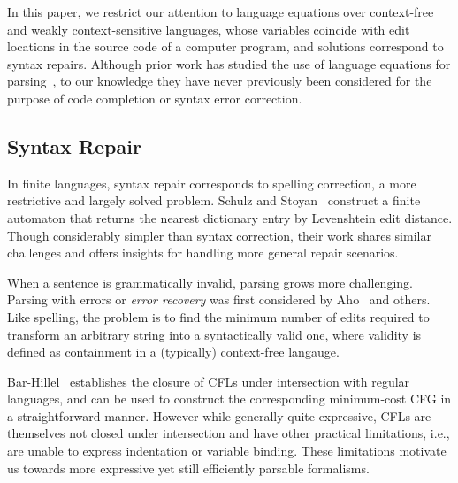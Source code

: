 \documentclass[sigplan,review,anonymous,acmsmall]{acmart}\settopmatter{printfolios=false,printccs=false,printacmref=false}
\begin{document}
In this paper, we restrict our attention to language equations over context-free and weakly context-sensitive languages, whose variables coincide with edit locations in the source code of a computer program, and solutions correspond to syntax repairs. Although prior work has studied the use of language equations for parsing~\cite{might2011parsing}, to our knowledge they have never previously been considered for the purpose of code completion or syntax error correction.



\subsection{Syntax Repair}

In finite languages, syntax repair corresponds to spelling correction, a more restrictive and largely solved problem. Schulz and Stoyan~\cite{schulz2002fast} construct a finite automaton that returns the nearest dictionary entry by Levenshtein edit distance. Though considerably simpler than syntax correction, their work shares similar challenges and offers insights for handling more general repair scenarios.

When a sentence is grammatically invalid, parsing grows more challenging. Parsing with errors or \textit{error recovery} was first considered by Aho~\cite{aho1972minimum, irons1963error} and others. Like spelling, the problem is to find the minimum number of edits required to transform an arbitrary string into a syntactically valid one, where validity is defined as containment in a (typically) context-free langauge.

Bar-Hillel~\cite{bar1961formal} establishes the closure of CFLs under intersection with regular languages, and can be used to construct the corresponding minimum-cost CFG in a straightforward manner. However while generally quite expressive, CFLs are themselves not closed under intersection and have other practical limitations, i.e., are unable to express indentation or variable binding. These limitations motivate us towards more expressive yet still efficiently parsable formalisms.
\end{document}
